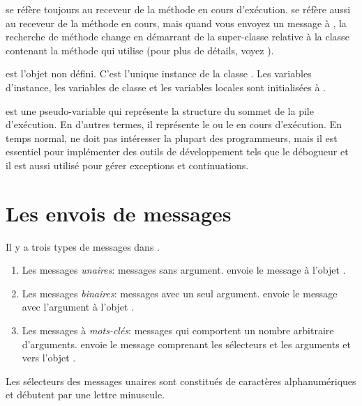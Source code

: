 \documentclass[a4paper,10pt,twoside]{book}
\begin{document}
 se r\'{e}f\`{e}re toujours au receveur de la m\'{e}thode en cours d'ex\'{e}cution.
 se r\'{e}f\`{e}re aussi au receveur de la m\'{e}thode en
cours, mais quand vous envoyez un message \`{a} \super, la recherche
de m\'{e}thode change en d\'{e}marrant de la super-classe relative \`{a} la classe contenant la m\'{e}thode qui utilise 
(pour plus de d\'{e}tails, voyez ).

 est l'objet non d\'{e}fini.
C'est l'unique instance de la classe . 
Les variables d'instance, les variables de classe et les variables locales  sont initialis\'{e}es \`{a} .

 est une pseudo-variable qui repr\'{e}sente la structure du sommet de la pile d'ex\'{e}cution.
En d'autres termes, il repr\'{e}sente le  ou le  en cours d'ex\'{e}cution.
En temps normal,  ne doit pas intéresser la plupart
des programmeurs, mais il est essentiel pour impl\'{e}menter des
outils de d\'{e}veloppement tels que le débogueur et il est aussi utilis\'{e} pour g\'{e}rer exceptions et continuations.

\section{Les envois de messages}

Il y a trois types de messages dans \sq.
\begin{enumerate}
  \item Les messages \emph{unaires}: messages sans argument.
   envoie le message   \`{a} l'objet .
  \item Les messages \emph{binaires}: messages avec un seul argument.
  	 envoie le message \ct{+} avec l'argument  \`{a} l'objet .
  \item Les messages \`{a} \emph{mots-cl\'{e}s}: messages qui comportent un nombre arbitraire d'arguments.
  	 envoie le message comprenant les s\'{e}lecteurs 	 et les arguments  et  vers l'objet .
\end{enumerate}

Les s\'{e}lecteurs des messages unaires sont constitu\'{e}s de caract\`{e}res alphanum\'{e}riques et d\'{e}butent par une lettre minuscule. 
\end{document}
